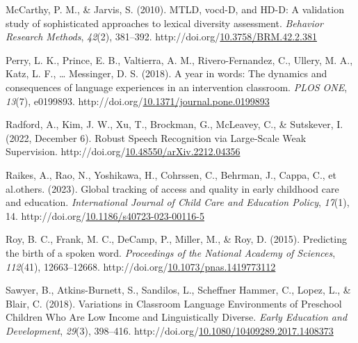 \documentclass[10pt, letterpaper]{article}
\newlength{\cslhangindent}
\newlength{\cslentryspacingunit} %
\newenvironment{CSLReferences}[2] %
{%
	\setlength{\parindent}{0pt}
	\ifodd #1
	\let\oldpar\par
	\def\par{\hangindent=\cslhangindent\oldpar}
	\fi
}%
{}
\begin{document}
\begin{CSLReferences}{1}{0}
\leavevmode{}%
McCarthy, P. M., \& Jarvis, S. (2010). {MTLD}, vocd-{D}, and {HD-D}: {A}
validation study of sophisticated approaches to lexical diversity
assessment. \emph{Behavior Research Methods}, \emph{42}(2), 381--392.
http://doi.org/\href{https://doi.org/10.3758/BRM.42.2.381}{10.3758/BRM.42.2.381}

\leavevmode{}%
Perry, L. K., Prince, E. B., Valtierra, A. M., Rivero-Fernandez, C.,
Ullery, M. A., Katz, L. F., \ldots{} Messinger, D. S. (2018). A year in
words: {The} dynamics and consequences of language experiences in an
intervention classroom. \emph{PLOS ONE}, \emph{13}(7), e0199893.
http://doi.org/\href{https://doi.org/10.1371/journal.pone.0199893}{10.1371/journal.pone.0199893}

\leavevmode{}%
Radford, A., Kim, J. W., Xu, T., Brockman, G., McLeavey, C., \&
Sutskever, I. (2022, December 6). Robust {Speech Recognition} via
{Large-Scale Weak Supervision}.
http://doi.org/\href{https://doi.org/10.48550/arXiv.2212.04356}{10.48550/arXiv.2212.04356}

\leavevmode{}%
Raikes, A., Rao, N., Yoshikawa, H., Cohrssen, C., Behrman, J., Cappa,
C., et al.others. (2023). Global tracking of access and quality in early
childhood care and education. \emph{International Journal of Child Care
and Education Policy}, \emph{17}(1), 14.
http://doi.org/\href{https://doi.org/10.1186/s40723-023-00116-5}{10.1186/s40723-023-00116-5}

\leavevmode{}%
Roy, B. C., Frank, M. C., DeCamp, P., Miller, M., \& Roy, D. (2015).
Predicting the birth of a spoken word. \emph{Proceedings of the National
Academy of Sciences}, \emph{112}(41), 12663--12668.
http://doi.org/\href{https://doi.org/10.1073/pnas.1419773112}{10.1073/pnas.1419773112}

\leavevmode{}%
Sawyer, B., Atkins-Burnett, S., Sandilos, L., Scheffner Hammer, C.,
Lopez, L., \& Blair, C. (2018). Variations in {Classroom Language
Environments} of {Preschool Children Who Are Low Income} and
{Linguistically Diverse}. \emph{Early Education and Development},
\emph{29}(3), 398--416.
http://doi.org/\href{https://doi.org/10.1080/10409289.2017.1408373}{10.1080/10409289.2017.1408373}


\end{CSLReferences}
\end{document}
